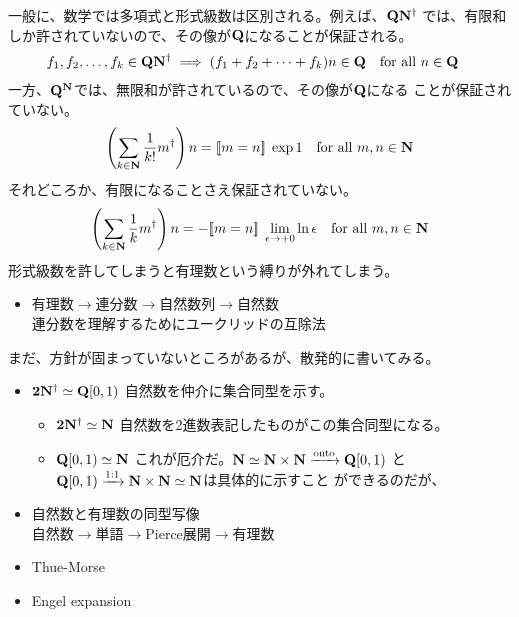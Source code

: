 	一般に、数学では多項式と形式級数は区別される。例えば、$\mathbf{Q}\mathbf{N}^\dag$
	では、有限和しか許されていないので、その像が$\mathbf{Q}$になることが保証される。
	\begin{equation*}\begin{split}
		f_1,f_2,\dots,f_k\in\mathbf{Q}\mathbf{N}^\dag 
		&\implies (f_1+f_2+\cdots+f_k)n\in\mathbf{Q}\quad\text{for all }n\in\mathbf{Q}
	\end{split}\end{equation*}
	一方、$\mathbf{Q}^{\mathbf{N}}$では、無限和が許されているので、その像が$\mathbf{Q}$になる
	ことが保証されていない。
	\begin{equation*}\begin{split}
		\left(\sum_{k\in\mathbf{N}}\frac{1}{k!}m^\dag\right)n = [\![m=n]\!]\;\exp1
		\quad\text{for all }m,n\in\mathbf{N}
	\end{split}\end{equation*}
	それどころか、有限になることさえ保証されていない。
	\begin{equation*}\begin{split}
		\left(\sum_{k\in\mathbf{N}}\frac{1}{k}m^\dag\right)n 
		= -[\![m=n]\!]\;\lim_{\epsilon\to+0}\ln\epsilon 
		\quad\text{for all }m,n\in\mathbf{N}
	\end{split}\end{equation*}
	形式級数を許してしまうと有理数という縛りが外れてしまう。

	\begin{todo}[ここまで]\label{todo:ここまで} %
		\begin{itemize}\setlength{\itemsep}{-1mm} %
			\item 有理数$\to$連分数$\to$自然数列$\to$自然数 \\
			連分数を理解するためにユークリッドの互除法
		\end{itemize} %
	\end{todo} %

	まだ、方針が固まっていないところがあるが、散発的に書いてみる。

\begin{itemize}\setlength{\itemsep}{-1mm} %
	\item ${\mathbf{2}}\mathbf{N}^\dag\simeq\mathbf{Q}[0,1)$
	自然数を仲介に集合同型を示す。
	\begin{itemize}\setlength{\itemsep}{-1mm} %
		\item ${\mathbf{2}}\mathbf{N}^\dag\simeq\mathbf{N}$
		自然数を2進数表記したものがこの集合同型になる。
		\item $\mathbf{Q}[0,1)\simeq\mathbf{N}$
		これが厄介だ。$\mathbf{N}\simeq\mathbf{N}\times\mathbf{N}\xrightarrow[{}]{{\operatorname{onto}}}\mathbf{Q}[0,1)$
		と$\mathbf{Q}[0,1)\xrightarrow[{}]{1:1}\mathbf{N}\times\mathbf{N}\simeq\mathbf{N}$は具体的に示すこと
		ができるのだが、
	\end{itemize} %
	\item 自然数と有理数の同型写像 \\
	自然数$\to$単語$\to$Pierce展開$\to$有理数
	\item Thue-Morse
	\item Engel expansion
\end{itemize} %

